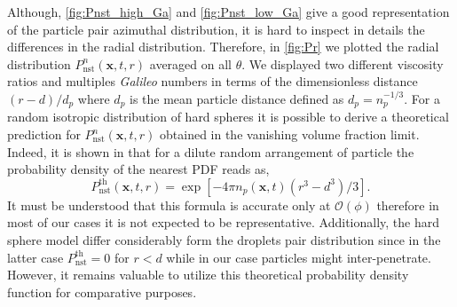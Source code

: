Although, \ref{fig:Pnst_high_Ga} and \ref{fig:Pnst_low_Ga} give a good representation of the particle pair azimuthal distribution, it is hard to inspect in details the differences in the radial distribution.
Therefore, in \ref{fig:Pr}  we plotted the radial distribution $P_\text{nst}^n(\textbf{x},t,r)$ averaged on all $\theta$.
We displayed two different viscosity ratios and multiples \textit{Galileo} numbers in terms of the dimensionless distance $(r - d)/d_p$ where $d_p$ is the mean particle distance defined as $d_p = n_p^{-1/3}$.  
For a random isotropic distribution of hard spheres it is possible to derive a theoretical prediction for $P_\text{nst}^n(\textbf{x},t,r)$ obtained in the vanishing volume fraction limit. 
Indeed, it is shown in \citet{zhang2021ensemble} that for a dilute random arrangement of particle the probability density of the nearest PDF reads as, 
\begin{equation}
    P_\text{nst}^\text{th}(\textbf{x},t,r) = \exp[{-4 \pi n_p(\textbf{x},t) (r^3 - d^3)/3}].
    \label{eq:Pnst_dilute}
\end{equation}
It must be understood that this formula is accurate only at $\mathcal{O}(\phi)$ therefore in most of our cases it is not expected to be representative. 
Additionally, the hard sphere model differ considerably form the droplets pair distribution since in the latter case $P_\text{nst}^\text{th} = 0$ for $r<d$ while in our case particles might inter-penetrate. 
However, it remains valuable to utilize this theoretical probability density function for comparative purposes. 

